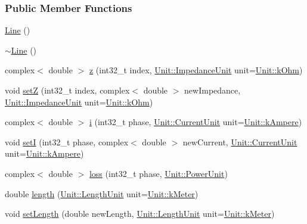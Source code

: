 \subsubsection*{Public Member Functions}
\begin{DoxyCompactItemize}
\item 
\hyperlink{group___models_gacc11b8a429d8cdd63ba6803dff5602b3}{Line} ()
\item 
\hyperlink{group___models_gaabe85f48d22d92b62257091f48174fac}{$\sim$\+Line} ()
\item 
complex$<$ double $>$ \hyperlink{group___models_gab5370574fd93e13eb11742f7753fe1f1}{z} (int32\+\_\+t index, \hyperlink{class_unit_a3747e779c805df24a71961290be3fbdf}{Unit\+::\+Impedance\+Unit} unit=\hyperlink{class_unit_a3747e779c805df24a71961290be3fbdfa6b9c74d1763eefbaf751eeecff0bd9da}{Unit\+::k\+Ohm})
\item 
void \hyperlink{group___models_ga409df7d11f5c5d594a13fb2f74b3b9e0}{set\+Z} (int32\+\_\+t index, complex$<$ double $>$ new\+Impedance, \hyperlink{class_unit_a3747e779c805df24a71961290be3fbdf}{Unit\+::\+Impedance\+Unit} unit=\hyperlink{class_unit_a3747e779c805df24a71961290be3fbdfa6b9c74d1763eefbaf751eeecff0bd9da}{Unit\+::k\+Ohm})
\item 
complex$<$ double $>$ \hyperlink{group___models_gaf81e7055102816465bdf7e19afc2d547}{i} (int32\+\_\+t phase, \hyperlink{class_unit_a0794cf6c9682f48296dd4a5315389787}{Unit\+::\+Current\+Unit} unit=\hyperlink{class_unit_a0794cf6c9682f48296dd4a5315389787a368a3c470f0b590a6100dda717a7dd4f}{Unit\+::k\+Ampere})
\item 
void \hyperlink{group___models_ga9e55b06dc3e385838fdd13d5580438ef}{set\+I} (int32\+\_\+t phase, complex$<$ double $>$ new\+Current, \hyperlink{class_unit_a0794cf6c9682f48296dd4a5315389787}{Unit\+::\+Current\+Unit} unit=\hyperlink{class_unit_a0794cf6c9682f48296dd4a5315389787a368a3c470f0b590a6100dda717a7dd4f}{Unit\+::k\+Ampere})
\item 
complex$<$ double $>$ \hyperlink{group___models_ga7909d69e419de3f460ca7abab3d91e53}{loss} (int32\+\_\+t phase, \hyperlink{class_unit_ace265ae255370ccacfd5370337572c3b}{Unit\+::\+Power\+Unit})
\item 
double \hyperlink{group___models_gae2e4500d0fa60dcc2ecb08b2c96954f9}{length} (\hyperlink{class_unit_a8c8921f7b225ad6063b1cb573425b9a0}{Unit\+::\+Length\+Unit} unit=\hyperlink{class_unit_a8c8921f7b225ad6063b1cb573425b9a0abfa41ebe7ee649a1f02c9b8ae570434b}{Unit\+::k\+Meter})
\item 
void \hyperlink{group___models_ga950d0b8f5d167eda430c65ca7adadbb0}{set\+Length} (double new\+Length, \hyperlink{class_unit_a8c8921f7b225ad6063b1cb573425b9a0}{Unit\+::\+Length\+Unit} unit=\hyperlink{class_unit_a8c8921f7b225ad6063b1cb573425b9a0abfa41ebe7ee649a1f02c9b8ae570434b}{Unit\+::k\+Meter})

\end{DoxyCompactItemize}
